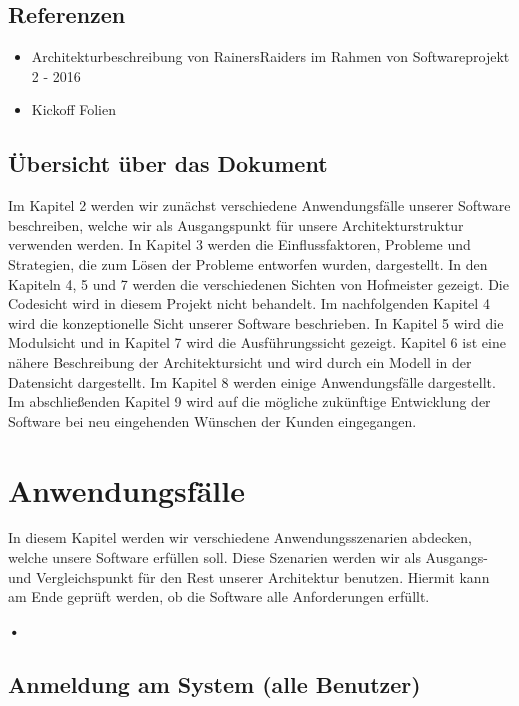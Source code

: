 \documentclass[enabledeprecatedfontcommands,fontsize=12pt,paper=a4,twoside]{scrartcl}
\begin{document}
\subsection{Referenzen}
\begin{itemize}
  \item Architekturbeschreibung von RainersRaiders im Rahmen von Softwareprojekt 2 - 2016
  \item Kickoff Folien
\end{itemize}
\subsection{Übersicht über das Dokument}

{  Im Kapitel 2 werden wir zunächst verschiedene Anwendungsfälle unserer Software beschreiben, welche wir als Ausgangspunkt für unsere Architekturstruktur verwenden werden. In Kapitel 3 werden die Einflussfaktoren, Probleme und Strategien, die zum Lösen der Probleme entworfen wurden, dargestellt.
In den Kapiteln 4, 5 und 7 werden die verschiedenen Sichten von Hofmeister gezeigt. Die Codesicht wird in diesem Projekt nicht behandelt.
Im nachfolgenden Kapitel 4 wird die konzeptionelle Sicht unserer Software beschrieben. In Kapitel 5 wird die Modulsicht und in Kapitel 7 wird die Ausführungssicht gezeigt. Kapitel 6 ist eine nähere Beschreibung der Architektursicht und wird durch ein Modell in der Datensicht dargestellt.
Im Kapitel 8 werden einige Anwendungsfälle dargestellt. Im abschließenden Kapitel 9 wird auf die mögliche zukünftige Entwicklung der Software bei neu eingehenden Wünschen der Kunden eingegangen.

}



\section{Anwendungsfälle}

In diesem Kapitel werden wir verschiedene Anwendungsszenarien abdecken, welche unsere Software erfüllen soll. Diese Szenarien werden wir als Ausgangs- und Vergleichspunkt für den Rest unserer Architektur benutzen. Hiermit kann am Ende geprüft werden, ob die Software alle Anforderungen erfüllt. 

\textbf{•}\subsection{Anmeldung am System (alle Benutzer)}
\end{document}
